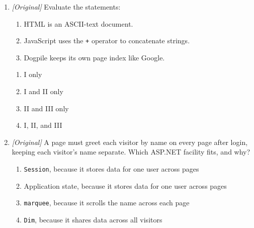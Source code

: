 \documentclass[11pt]{article}
\begin{document}
\begin{enumerate}[label=\textbf{Q\arabic*.}, leftmargin=*]
\begin{enumerate}[label=\Alph*.]
    \item \texttt{Dim} --- VBScript variable declaration
    \item \texttt{Session} --- shared by all users
  \end{enumerate}
\item \textit{[Original]} Evaluate the statements:
  \begin{enumerate}[label=\Roman*.]
    \item HTML is an ASCII-text document.
    \item JavaScript uses the \texttt{+} operator to concatenate strings.
    \item Dogpile keeps its own page index like Google.
  \end{enumerate}
  \begin{enumerate}[label=\Alph*.]
    \item I only
    \item I and II only
    \item II and III only
    \item I, II, and III
  \end{enumerate}
\item \textit{[Original]} A page must greet each visitor by name on every page
  after login, keeping each visitor's name separate. Which ASP.NET facility
  fits, and why?
  \begin{enumerate}[label=\Alph*.]
    \item \texttt{Session}, because it stores data for one user across pages
    \item Application state, because it stores data for one user across pages
    \item \texttt{marquee}, because it scrolls the name across each page
    \item \texttt{Dim}, because it shares data across all visitors
  \end{enumerate}


\end{enumerate}
\end{document}
